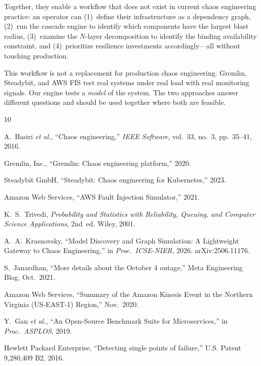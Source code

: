 \documentclass[conference,10pt]{IEEEtran}
\begin{document}
Together, they enable a workflow that does not exist in current
chaos engineering practice: an operator can (1)~define their
infrastructure as a dependency graph, (2)~run the cascade engine
to identify which components have the largest blast radius,
(3)~examine the $N$-layer decomposition to identify the binding
availability constraint, and (4)~prioritize resilience investments
accordingly---all without touching production.

This workflow is not a replacement for production chaos
engineering. Gremlin, Steadybit, and AWS FIS test real systems
under real load with real monitoring signals. Our engine tests
a \emph{model} of the system. The two approaches answer different
questions and should be used together where both are feasible.


\begin{thebibliography}{10}

A.~Basiri \textit{et al.},
``Chaos engineering,''
\textit{IEEE Software}, vol.~33, no.~3, pp.~35--41, 2016.

Gremlin, Inc.,
``Gremlin: Chaos engineering platform,'' 2020.

Steadybit GmbH,
``Steadybit: Chaos engineering for Kubernetes,'' 2023.

Amazon Web Services,
``AWS Fault Injection Simulator,'' 2021.

K.~S.~Trivedi,
\textit{Probability and Statistics with Reliability, Queuing, and
Computer Science Applications}, 2nd~ed.
Wiley, 2001.

A.~A.~Krasnovsky,
``Model Discovery and Graph Simulation: A Lightweight Gateway to
Chaos Engineering,''
in \textit{Proc.\ ICSE-NIER}, 2026.
arXiv:2506.11176.

S.~Janardhan,
``More details about the October 4 outage,''
Meta Engineering Blog, Oct.~2021.

Amazon Web Services,
``Summary of the Amazon Kinesis Event in the Northern Virginia
(US-EAST-1) Region,'' Nov.~2020.

Y.~Gan \textit{et al.},
``An Open-Source Benchmark Suite for Microservices,''
in \textit{Proc.\ ASPLOS}, 2019.

Hewlett Packard Enterprise,
``Detecting single points of failure,''
U.S. Patent 9,280,409 B2, 2016.

\end{thebibliography}
\end{document}
